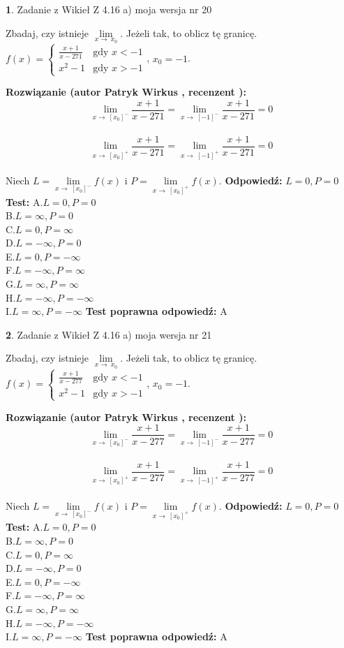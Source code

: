 \documentclass[12pt, a4paper]{article}
\theoremstyle{definition} %
\newtheorem{zad}{}
\newcommand{\zadStart}[1]{\begin{zad}#1\newline}
\newcommand{\zadStop}{\end{zad}}
\newcommand{\rozwStart}[2]{\noindent \textbf{Rozwiązanie (autor #1 , recenzent #2): }\newline}
\newcommand{\rozwStop}{\newline}
\newcommand{\odpStart}{\noindent \textbf{Odpowiedź:}\newline}
\newcommand{\odpStop}{\newline}
\newcommand{\testStart}{\noindent \textbf{Test:}\newline}
\newcommand{\testStop}{\newline}
\newcommand{\kluczStart}{\noindent \textbf{Test poprawna odpowiedź:}\newline}
\newcommand{\kluczStop}{\newline}
\begin{document}
\zadStart{Zadanie z Wikieł Z 4.16 a) moja wersja nr 20}

Zbadaj, czy istnieje $\lim\limits_{x\to\ x_{0}}$. Jeżeli tak, to oblicz tę granicę.\\   $f(x) = \left\{ \begin{array}{ll}
\frac{x+1}{x-271} & \textrm{gdy $x<-1$}\\
x^{2}-1 & \textrm{gdy $x>-1$}
\end{array} \right.$, $x_{0}=-1$.
\zadStop
\rozwStart{Patryk Wirkus}{}
$$\lim\limits_{x\to\ [x_{0}]^{-}}\frac{x+1}{x-271} = \lim\limits_{x\to\ [-1]^{-}}\frac{x+1}{x-271} = 0$$
\\
$$\lim\limits_{x\to\ [x_{0}]^{+}}\frac{x+1}{x-271} = \lim\limits_{x\to\ [-1]^{+}}\frac{x+1}{x-271} = 0$$
\\
Niech $L=\lim\limits_{x\to\ [x_{0}]^{-}}f(x)$ i $P=\lim\limits_{x\to\ [x_{0}]^{+}}f(x)$.
\rozwStop
\odpStart
$L=0, P=0$
\odpStop
\testStart
A.$L=0, P=0$\\ B.$L=\infty, P=0$\\ C.$L=0, P=\infty$\\ D.$L=-\infty, P=0$\\ E.$L=0, P=-\infty$\\
F.$L=-\infty, P=\infty$\\ G.$L=\infty, P=\infty$\\
H.$L=-\infty, P=-\infty$\\
I.$L=\infty, P=-\infty$
\testStop
\kluczStart
A
\kluczStop



\zadStart{Zadanie z Wikieł Z 4.16 a) moja wersja nr 21}

Zbadaj, czy istnieje $\lim\limits_{x\to\ x_{0}}$. Jeżeli tak, to oblicz tę granicę.\\   $f(x) = \left\{ \begin{array}{ll}
\frac{x+1}{x-277} & \textrm{gdy $x<-1$}\\
x^{2}-1 & \textrm{gdy $x>-1$}
\end{array} \right.$, $x_{0}=-1$.
\zadStop
\rozwStart{Patryk Wirkus}{}
$$\lim\limits_{x\to\ [x_{0}]^{-}}\frac{x+1}{x-277} = \lim\limits_{x\to\ [-1]^{-}}\frac{x+1}{x-277} = 0$$
\\
$$\lim\limits_{x\to\ [x_{0}]^{+}}\frac{x+1}{x-277} = \lim\limits_{x\to\ [-1]^{+}}\frac{x+1}{x-277} = 0$$
\\
Niech $L=\lim\limits_{x\to\ [x_{0}]^{-}}f(x)$ i $P=\lim\limits_{x\to\ [x_{0}]^{+}}f(x)$.
\rozwStop
\odpStart
$L=0, P=0$
\odpStop
\testStart
A.$L=0, P=0$\\ B.$L=\infty, P=0$\\ C.$L=0, P=\infty$\\ D.$L=-\infty, P=0$\\ E.$L=0, P=-\infty$\\
F.$L=-\infty, P=\infty$\\ G.$L=\infty, P=\infty$\\
H.$L=-\infty, P=-\infty$\\
I.$L=\infty, P=-\infty$
\testStop
\kluczStart
A
\kluczStop
\end{document}
